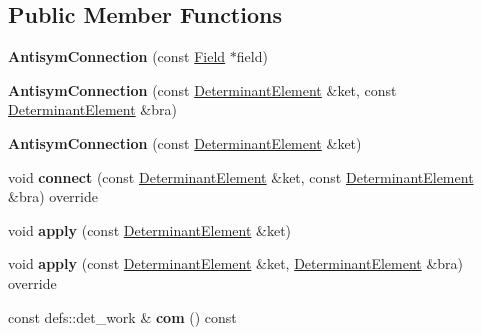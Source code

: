 \subsection*{Public Member Functions}
\begin{DoxyCompactItemize}
\item 
{\bfseries Antisym\+Connection} (const \hyperlink{classField}{Field} $\ast$field)\hypertarget{classAntisymConnection_aaee6b6954a7a024a68f648652447f6b0}{}\label{classAntisymConnection_aaee6b6954a7a024a68f648652447f6b0}

\item 
{\bfseries Antisym\+Connection} (const \hyperlink{classDeterminantElement}{Determinant\+Element} \&ket, const \hyperlink{classDeterminantElement}{Determinant\+Element} \&bra)\hypertarget{classAntisymConnection_ac340ada066d7220944961e6fd815419e}{}\label{classAntisymConnection_ac340ada066d7220944961e6fd815419e}

\item 
{\bfseries Antisym\+Connection} (const \hyperlink{classDeterminantElement}{Determinant\+Element} \&ket)\hypertarget{classAntisymConnection_a4efe834c774fe0537dd85fa83801dd18}{}\label{classAntisymConnection_a4efe834c774fe0537dd85fa83801dd18}

\item 
void {\bfseries connect} (const \hyperlink{classDeterminantElement}{Determinant\+Element} \&ket, const \hyperlink{classDeterminantElement}{Determinant\+Element} \&bra) override\hypertarget{classAntisymConnection_a6c4fac9e367a748774108d4da5d8f3f8}{}\label{classAntisymConnection_a6c4fac9e367a748774108d4da5d8f3f8}

\item 
void {\bfseries apply} (const \hyperlink{classDeterminantElement}{Determinant\+Element} \&ket)\hypertarget{classAntisymConnection_a0eb1b8853be6cd73b8f1d6b488915c1b}{}\label{classAntisymConnection_a0eb1b8853be6cd73b8f1d6b488915c1b}

\item 
void {\bfseries apply} (const \hyperlink{classDeterminantElement}{Determinant\+Element} \&ket, \hyperlink{classDeterminantElement}{Determinant\+Element} \&bra) override\hypertarget{classAntisymConnection_a987a278b67158864215ef48f7d17f3e8}{}\label{classAntisymConnection_a987a278b67158864215ef48f7d17f3e8}

\item 
const defs\+::det\+\_\+work \& {\bfseries com} () const \hypertarget{classAntisymConnection_a7ea22c794cd53aba127c6c8f04fa4455}{}\label{classAntisymConnection_a7ea22c794cd53aba127c6c8f04fa4455}


\end{DoxyCompactItemize}
